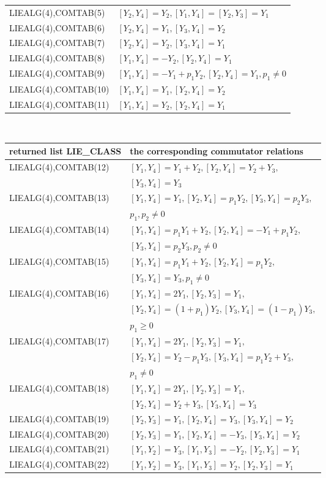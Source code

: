 \begin{tabular}{l|l}
{LIEALG(4),COMTAB(5)}&$[Y_2,Y_4]=Y_2,[Y_1,Y_4]=[Y_2,Y_3]=Y_1$\\[0.1cm]
{LIEALG(4),COMTAB(6)}&$[Y_2,Y_4]=Y_1,[Y_3,Y_4]=Y_2$\\[0.1cm]
{LIEALG(4),COMTAB(7)}&$[Y_2,Y_4]=Y_2,[Y_3,Y_4]=Y_1$\\[0.1cm]
{LIEALG(4),COMTAB(8)}&$[Y_1,Y_4]=-Y_2,[Y_2,Y_4]=Y_1$\\[0.1cm]
{LIEALG(4),COMTAB(9)}&$[Y_1,Y_4]=-Y_1+p_1 Y_2,[Y_2,Y_4]=Y_1,p_1\neq 0$\\[0.1cm]
{LIEALG(4),COMTAB(10)}&$[Y_1,Y_4]=Y_1,[Y_2,Y_4]=Y_2$\\[0.1cm]
{LIEALG(4),COMTAB(11)}&$[Y_1,Y_4]=Y_2,[Y_2,Y_4]=Y_1$
\end{tabular}\\
\hspace*{0.3cm}\begin{tabular}{l|l}returned list LIE\_CLASS&
the corresponding commutator relations\\[0.1cm]\hline
{LIEALG(4),COMTAB(12)}&$[Y_1,Y_4]=Y_1+Y_2,[Y_2,Y_4]=Y_2+Y_3,$\\
                      &$[Y_3,Y_4]=Y_3$\\[0.1cm]
{LIEALG(4),COMTAB(13)}&$[Y_1,Y_4]=Y_1,[Y_2,Y_4]=p_1 Y_2,[Y_3,Y_4]=p_2 Y_3,$\\
                      &$p_1,p_2\neq 0$\\[0.1cm]
{LIEALG(4),COMTAB(14)}&$[Y_1,Y_4]=p_1 Y_1+Y_2,[Y_2,Y_4]=-Y_1+p_1 Y_2,$\\
                      &$[Y_3,Y_4]=p_2 Y_3,p_2\neq 0$\\[0.1cm]
{LIEALG(4),COMTAB(15)}&$[Y_1,Y_4]=p_1 Y_1+Y_2,[Y_2,Y_4]=p_1 Y_2,$\\
                      &$[Y_3,Y_4]=Y_3,p_1\neq 0$\\[0.1cm]
{LIEALG(4),COMTAB(16)}&$[Y_1,Y_4]=2 Y_1,[Y_2,Y_3]=Y_1,$\\
                      &$[Y_2,Y_4]=(1+p_1) Y_2,[Y_3,Y_4]=(1-p_1) Y_3,$\\
                      &$p_1\geq 0$\\[0.1cm]
{LIEALG(4),COMTAB(17)}&$[Y_1,Y_4]=2 Y_1,[Y_2,Y_3]=Y_1,$\\
                      &$[Y_2,Y_4]=Y_2-p_1 Y_3,[Y_3,Y_4]=p_1 Y_2+Y_3,$\\
                      &$p_1\neq 0$\\[0.1cm]
{LIEALG(4),COMTAB(18)}&$[Y_1,Y_4]=2 Y_1,[Y_2,Y_3]=Y_1,$\\
                      &$[Y_2,Y_4]=Y_2+Y_3,[Y_3,Y_4]=Y_3$\\[0.1cm]
{LIEALG(4),COMTAB(19)}&$[Y_2,Y_3]=Y_1,[Y_2,Y_4]=Y_3,[Y_3,Y_4]=Y_2$\\[0.1cm]
{LIEALG(4),COMTAB(20)}&$[Y_2,Y_3]=Y_1,[Y_2,Y_4]=-Y_3,[Y_3,Y_4]=Y_2$\\[0.1cm]
{LIEALG(4),COMTAB(21)}&$[Y_1,Y_2]=Y_3,[Y_1,Y_3]=-Y_2,[Y_2,Y_3]=Y_1$\\[0.1cm]
{LIEALG(4),COMTAB(22)}&$[Y_1,Y_2]=Y_3,[Y_1,Y_3]=Y_2,[Y_2,Y_3]=Y_1$
\end{tabular}


